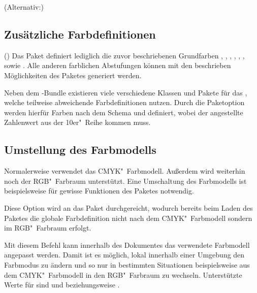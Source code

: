 \begin{DeclareEntity}{}
\begin{Declaration}
  {}
  (Alternativ:)
\printdeclarationlist
{}
\end{Declaration}



\subsection{Zusätzliche Farbdefinitionen}
%
\begin{Declaration}
  {}
  ()
\printdeclarationlist
%
Das Paket  definiert lediglich die zuvor beschriebenen 
Grundfarben , , , , 
, ,  sowie . 
Alle anderen farblichen Abstufungen können mit den beschrieben Möglichkeiten 
des Paketes  generiert werden.
\end{Declaration}

\begin{Declaration}
  {}
\printdeclarationlist
%
Neben dem \TUDScript-Bundle existieren viele verschiedene Klassen und Pakete 
für das \CD, welche teilweise abweichende Farbdefinitionen nutzen. Durch die 
Paketoption  werden hierfür Farben nach dem Schema 
 und  definiert, wobei 
der angestellte Zahlenwert aus der 10er"~Reihe kommen muss.
\end{Declaration}



\subsection{%
  Umstellung des Farbmodells%
}
%
Normalerweise verwendet  das CMYK"~Farbmodell. Außerdem 
wird weiterhin noch der RGB"~Farbraum unterstützt. Eine Umschaltung des 
Farbmodells ist beispielsweise für gewisse Funktionen des Paketes 
 notwendig.

\begin{Declaration}
  {}
\printdeclarationlist
%
Diese Option wird an das Paket  durchgereicht, wodurch bereits 
beim Laden des Paketes die globale Farbdefinition nicht nach dem 
CMYK"~Farbmodell sondern im RGB"~Farbraum erfolgt.
\end{Declaration}

\begin{Declaration}
  {}
\printdeclarationlist
%
Mit diesem Befehl kann innerhalb des Dokumentes das verwendete Farbmodell 
angepasst werden. Damit ist es möglich, lokal innerhalb einer Umgebung den 
Farbmodus zu ändern und so nur in bestimmten Situationen beispielsweise aus dem 
CMYK"~Farbmodell in den RGB"~Farbraum zu wechseln. Unterstützte Werte für 
 sind  und  beziehungsweise 
.
\end{Declaration}


\end{DeclareEntity}
